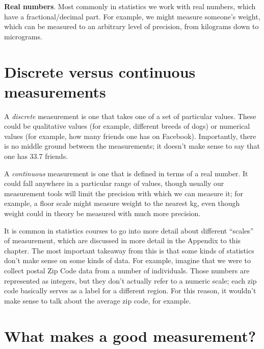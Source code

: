 \documentclass[12pt,]{book}
\theoremstyle{definition}
\theoremstyle{definition}
\theoremstyle{definition}
\theoremstyle{remark}
\begin{document}
\textbf{Real numbers}. Most commonly in statistics we work with real numbers, which have a fractional/decimal part. For example, we might measure someone's weight, which can be measured to an arbitrary level of precision, from kilograms down to micrograms.

\hypertarget{discrete-versus-continuous-measurements}{%
\section{Discrete versus continuous measurements}\label{discrete-versus-continuous-measurements}}

A \emph{discrete} measurement is one that takes one of a set of particular values. These could be qualitative values (for example, different breeds of dogs) or numerical values (for example, how many friends one has on Facebook). Importantly, there is no middle ground between the measurements; it doesn't make sense to say that one has 33.7 friends.

A \emph{continuous} measurement is one that is defined in terms of a real number. It could fall anywhere in a particular range of values, though usually our measurement tools will limit the precision with which we can measure it; for example, a floor scale might measure weight to the nearest kg, even though weight could in theory be measured with much more precision.

It is common in statistics courses to go into more detail about different ``scales'' of measurement, which are discussed in more detail in the Appendix to this chapter. The most important takeaway from this is that some kinds of statistics don't make sense on some kinds of data. For example, imagine that we were to collect postal Zip Code data from a number of individuals. Those numbers are represented as integers, but they don't actually refer to a numeric scale; each zip code basically serves as a label for a different region. For this reason, it wouldn't make sense to talk about the average zip code, for example.

\hypertarget{what-makes-a-good-measurement}{%
\section{What makes a good measurement?}\label{what-makes-a-good-measurement}}
\end{document}
